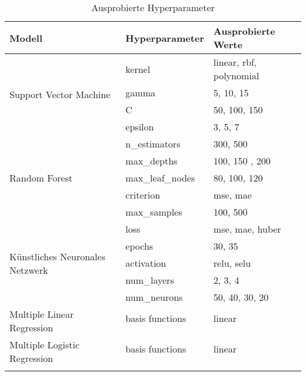 \begin{table}[ht]
  \caption{\label{tab:hyperparameter} Ausprobierte Hyperparameter}
  \begin{tabular}{ p{4cm}  p{4cm}  p{5cm} }
    \toprule
    Modell                                               & Hyperparameter   & Ausprobierte Werte      \\
    \midrule
    \multirow{4}{7em}{Support Vector Machine}            & kernel           & linear, rbf, polynomial \\
                                                         & gamma            & 5, 10, 15               \\
                                                         & C                & 50, 100, 150            \\
                                                         & epsilon          & 3, 5, 7                 \\
    \midrule
    \multirow{5}{7em}{Random Forest}                     & n\_estimators    & 300, 500                \\
                                                         & max\_depths      & 100, 150 , 200          \\
                                                         & max\_leaf\_nodes & 80, 100, 120            \\
                                                         & criterion        & mse, mae                \\
                                                         & max\_samples     & 100, 500                \\
    \midrule
    \multirow{5}{7em}{K\"unstliches Neuronales Netzwerk} & loss             & mse, mae, huber         \\
                                                         & epochs           & 30, 35                  \\
                                                         & activation       & relu, selu              \\
                                                         & num\_layers      & 2, 3, 4                 \\
                                                         & num\_neurons     & 50, 40, 30, 20          \\
    \midrule
    \multirow{2}{7em}{Multiple Linear Regression}        & basis functions  & linear                  \\
                                                         &                  &                         \\
    \midrule
    \multirow{2}{7em}{Multiple Logistic Regression}      & basis functions  & linear                  \\
                                                         &                  &                         \\
                                                         &                  &                         \\
    \bottomrule
  \end{tabular}

\end{table}

